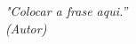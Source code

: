 \begin{epigrafe}
    \vspace*{\fill}
	\begin{flushright}
	\textit{"Colocar a frase aqui.''\\
		(Autor)}
	\end{flushright}
\end{epigrafe}
\newpage
